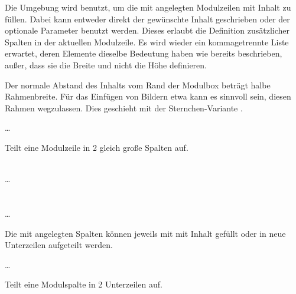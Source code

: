 Die Umgebung  wird benutzt,
um die mit  angelegten Modulzeilen mit Inhalt zu füllen.
Dabei kann entweder direkt der gewünschte Inhalt geschrieben oder der optionale
Parameter  benutzt werden.
Dieses erlaubt die Definition zusätzlicher Spalten in der aktuellen Modulzeile.
Es wird wieder ein kommagetrennte Liste erwartet,
deren Elemente dieselbe Bedeutung haben wie bereits beschrieben, außer, dass
sie die Breite und nicht die Höhe definieren.

Der normale Abstand des Inhalts vom Rand der Modulbox beträgt halbe
Rahmenbreite. Für das Einfügen von Bildern etwa kann es sinnvoll sein,
diesen Rahmen wegzulassen.
Dies geschieht mit der Sternchen-Variante .


\begin{minipage}{0.6\textwidth}
\begin{example}\par
  \noindent{}
    \par
  \quad\dots\\
  \bigskip\par
  \noindent Teilt eine Modulzeile in 2 gleich große Spalten auf.
\end{example}
\end{minipage}
\hfill
\begin{minipage}{0.3\textwidth}\centering
\end{minipage}

\begin{Declaration}
    \\%
  \quad\dots\\
  \\
    \\%
  \quad\dots\\
\end{Declaration}

Die mit  angelegten Spalten können jeweils mit 
 mit Inhalt gefüllt oder in neue Unterzeilen aufgeteilt 
werden.

\begin{minipage}{0.6\textwidth}
\begin{example}\par
  \noindent{}
    \par
  \quad\dots\\
  \bigskip\par
  \noindent Teilt eine Modulspalte in 2 Unterzeilen auf.
\end{example}
\end{minipage}
\hfill
\begin{minipage}{0.3\textwidth}\centering
\end{minipage}


